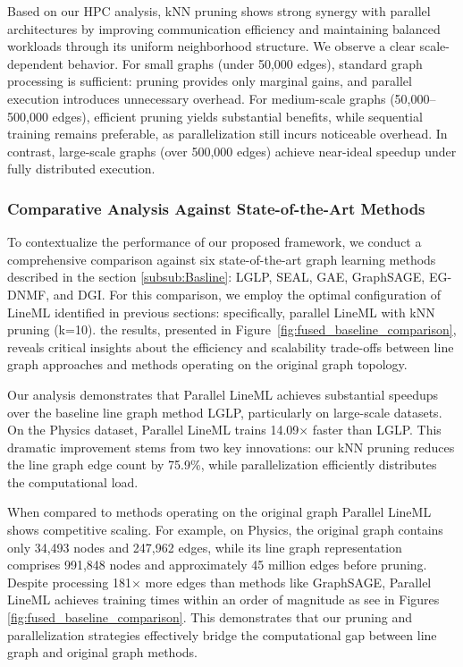 \documentclass[pdflatex,sn-mathphys-num]{sn-jnl}%
\theoremstyle{thmstyleone}%
\theoremstyle{thmstyletwo}%
\theoremstyle{thmstylethree}%
\theoremstyle{plain} %
\theoremstyle{definition} %
\theoremstyle{remark} %
\theoremstyle{plain} %
\begin{document}
Based on our HPC analysis, kNN pruning shows strong synergy with parallel architectures by improving communication efficiency and maintaining balanced workloads through its uniform neighborhood structure. We observe a clear scale-dependent behavior. For small graphs (under 50,000 edges), standard graph processing is sufficient: pruning provides only marginal gains, and parallel execution introduces unnecessary overhead. For medium-scale graphs (50,000–500,000 edges), efficient pruning yields substantial benefits, while sequential training remains preferable, as parallelization still incurs noticeable overhead. In contrast, large-scale graphs (over 500,000 edges) achieve near-ideal speedup under fully distributed execution.




\subsubsection{Comparative Analysis Against State-of-the-Art Methods}
\label{subsec:baseline_comparison}

To contextualize the performance of our proposed framework, we conduct a comprehensive comparison against six state-of-the-art graph learning methods described in the section \ref{subsub:Basline}: LGLP, SEAL, GAE, GraphSAGE, EG-DNMF, and DGI.
For this comparison, we employ the optimal configuration of LineML identified in previous sections: specifically, parallel LineML with kNN pruning (k=10).
the results, presented in Figure~\ref{fig:fused_baseline_comparison}, reveals critical insights about the efficiency and scalability trade-offs between line graph approaches and methods operating on the original graph topology.

Our analysis demonstrates that Parallel LineML achieves substantial speedups over the baseline line graph method LGLP, particularly on large-scale datasets. 
On the Physics dataset, Parallel LineML trains 14.09$\times$ faster than LGLP.
This dramatic improvement stems from two key innovations: our kNN pruning reduces the line graph edge count by 75.9\%, while parallelization efficiently distributes the computational load.

When compared to methods operating on the original graph Parallel LineML shows competitive scaling. 
For example, on Physics, the original graph contains only 34,493 nodes and 247,962 edges, while its line graph representation comprises 991,848 nodes and approximately 45 million edges before pruning. 
Despite processing 181$\times$ more edges than methods like GraphSAGE, Parallel LineML achieves training times within an order of magnitude as see in Figures \ref{fig:fused_baseline_comparison}. 
This demonstrates that our pruning and parallelization strategies effectively bridge the computational gap between line graph and original graph methods.
\end{document}
